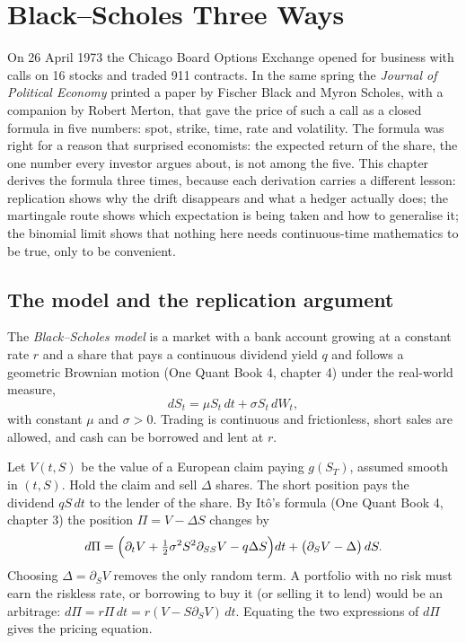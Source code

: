 \chapter{Black--Scholes Three Ways}\label{ch:dv:black-scholes-three-ways}

On 26 April 1973 the Chicago Board Options Exchange opened for business with
calls on 16 stocks and traded 911 contracts. In the same spring the
\emph{Journal of Political Economy} printed a paper by Fischer Black and Myron
Scholes, with a companion by Robert Merton, that gave the price of such a call
as a closed formula in five numbers: spot, strike, time, rate and
volatility. The formula was right for a reason that surprised economists: the
expected return of the share, the one number every investor argues about, is
not among the five. This chapter derives the formula three times, because each
derivation carries a different lesson: replication shows why the drift
disappears and what a hedger actually does; the martingale route shows which
expectation is being taken and how to generalise it; the binomial limit shows
that nothing here needs continuous-time mathematics to be true, only to be
convenient.

\section{The model and the replication argument}

\begin{definition}\label{def:dv:black-scholes-three-ways:model}
The \emph{Black--Scholes model} is a market with a
bank account growing at a constant rate $r$ and a share that pays a continuous
dividend yield $q$ and follows a geometric Brownian motion (One Quant Book 4,
chapter 4) under the real-world measure,
\[
dS_t=\mu S_t\,dt+\sigma S_t\,dW_t,
\]
with constant $\mu$ and $\sigma>0$. Trading is continuous and frictionless,
short sales are allowed, and cash can be borrowed and lent at $r$.
\end{definition}

Let $V(t,S)$ be the value of a European claim paying $g(S_T)$, assumed smooth in
$(t,S)$. Hold the claim and sell $\Delta$ shares. The short position pays the
dividend $qS\,dt$ to the lender of the share. By Itô's formula (One Quant Book 4,
chapter 3) the position $\Pi=V-\Delta S$ changes by
\[
d\Pi=\Bigl(\partial_tV+\tfrac12\sigma^2S^2\partial_{SS}V-q\Delta S\Bigr)dt
+\bigl(\partial_SV-\Delta\bigr)\,dS .
\]
Choosing $\Delta=\partial_SV$ removes the only random term. A portfolio with no
risk must earn the riskless rate, or borrowing to buy it (or selling it to
lend) would be an arbitrage: $d\Pi=r\Pi\,dt=r(V-S\partial_SV)\,dt$. Equating the
two expressions of $d\Pi$ gives the pricing equation.

